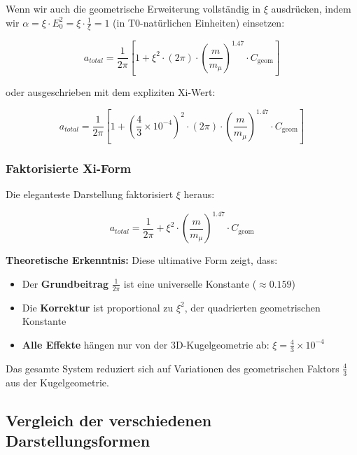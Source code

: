 \documentclass[12pt,a4paper]{article}
\numberwithin{equation}{section}
\newcommand{\xipar}{\xi}
\newcommand{\Cgeom}{C_{\text{geom}}}
\newcommand{\mmu}{m_{\mu}}
\begin{document}
	Wenn wir auch die geometrische Erweiterung vollständig in $\xipar$ ausdrücken, indem wir $\alpha = \xipar \cdot E_0^2 = \xipar \cdot \frac{1}{\xipar} = 1$ (in T0-natürlichen Einheiten) einsetzen:
	
	\begin{equation}
		\boxed{a_{total} = \frac{1}{2\pi} \left[1 + \xipar^2 \cdot (2\pi) \cdot \left(\frac{m}{\mmu}\right)^{1.47} \cdot \Cgeom\right]}
	\end{equation}
	
	oder ausgeschrieben mit dem expliziten Xi-Wert:
	
	\begin{equation}
		\boxed{a_{total} = \frac{1}{2\pi} \left[1 + \left(\frac{4}{3} \times 10^{-4}\right)^2 \cdot (2\pi) \cdot \left(\frac{m}{\mmu}\right)^{1.47} \cdot \Cgeom\right]}
	\end{equation}
	
	\subsubsection{Faktorisierte Xi-Form}
	
	Die eleganteste Darstellung faktorisiert $\xipar$ heraus:
	
	\begin{equation}
		\boxed{a_{total} = \frac{1}{2\pi} + \xipar^2 \cdot \left(\frac{m}{\mmu}\right)^{1.47} \cdot \Cgeom}
	\end{equation}
	
	\textbf{Theoretische Erkenntnis:} Diese ultimative Form zeigt, dass:
	\begin{itemize}
		\item Der \textbf{Grundbeitrag} $\frac{1}{2\pi}$ ist eine universelle Konstante ($\approx 0.159$)
		\item Die \textbf{Korrektur} ist proportional zu $\xipar^2$, der quadrierten geometrischen Konstante
		\item \textbf{Alle Effekte} hängen nur von der 3D-Kugelgeometrie ab: $\xipar = \frac{4}{3} \times 10^{-4}$
	\end{itemize}
	
	Das gesamte System reduziert sich auf Variationen des geometrischen Faktors $\frac{4}{3}$ aus der Kugelgeometrie.
	
	\subsection{Vergleich der verschiedenen Darstellungsformen}
	
\end{document}
